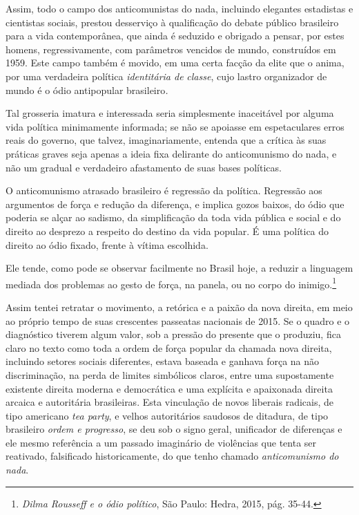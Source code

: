 Assim, todo o campo dos anticomunistas do nada, incluindo elegantes
estadistas e cientistas sociais, prestou desserviço à qualificação do
debate público brasileiro para a vida contemporânea, que ainda é
seduzido e obrigado a pensar, por estes homens, regressivamente, com
parâmetros vencidos de mundo, construídos em 1959. Este campo também é
movido, em uma certa facção da elite que o anima, por uma verdadeira
política \emph{identitária de} \emph{classe}, cujo lastro organizador de
mundo é o ódio antipopular brasileiro\emph{. }

Tal grosseria imatura e interessada seria simplesmente inaceitável por
alguma vida política minimamente informada; se não se apoiasse em
espetaculares erros reais do governo, que talvez, imaginariamente,
entenda que a crítica às suas práticas graves seja apenas a ideia fixa
delirante do anticomunismo do nada, e não um gradual e verdadeiro
afastamento de suas bases políticas.

O anticomunismo atrasado brasileiro é regressão da política. Regressão
aos argumentos de força e redução da diferença, e implica gozos baixos,
do ódio que poderia se alçar ao sadismo, da simplificação da toda vida
pública e social e do direito ao desprezo a respeito do destino da vida
popular. É uma política do direito ao ódio fixado, frente à vítima
escolhida.

Ele tende, como pode se observar facilmente no Brasil hoje, a reduzir a
linguagem mediada dos problemas ao gesto de força, na panela, ou no
corpo do inimigo.\footnote{\emph{Dilma Rousseff e o ódio político}, São
  Paulo: Hedra, 2015, pág. 35-44.}

Assim tentei retratar o movimento, a retórica e a paixão da nova
direita, em meio ao próprio tempo de suas crescentes passeatas nacionais
de 2015. Se o quadro e o diagnóstico tiverem algum valor, sob a pressão
do presente que o produziu, fica claro no texto como toda a ordem de
força popular da chamada nova direita, incluindo setores sociais
diferentes, estava baseada e ganhava força na não discriminação, na
perda de limites simbólicos claros, entre uma supostamente existente
direita moderna e democrática e uma explícita e apaixonada direita
arcaica e autoritária brasileiras. Esta vinculação de novos liberais
radicais, de tipo americano \emph{tea party}, e velhos autoritários
saudosos de ditadura, de tipo brasileiro \emph{ordem e progresso}, se
deu sob o signo geral, unificador de diferenças e ele mesmo referência a
um passado imaginário de violências que tenta ser reativado, falsificado
historicamente, do que tenho chamado \emph{anticomunismo do nada}.

